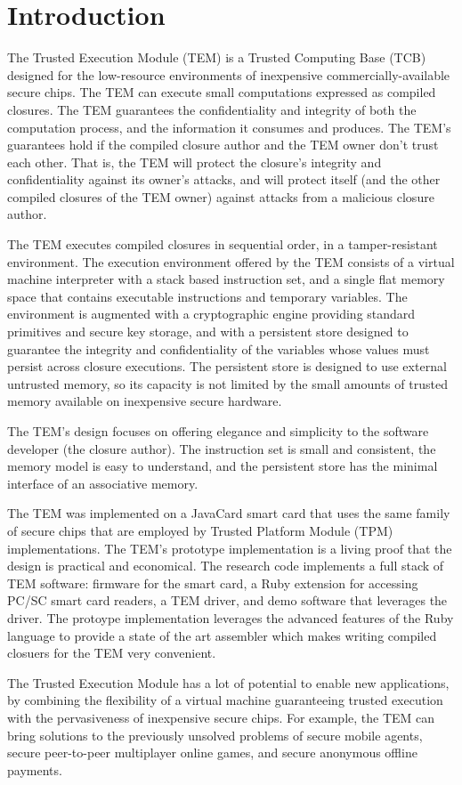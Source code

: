 \chapter{Introduction}\label{intro}

The Trusted Execution Module (TEM) is a Trusted Computing Base (TCB) designed
for the low-resource environments of inexpensive commercially-available secure
chips. The TEM can execute small computations expressed as compiled closures.
The TEM guarantees the confidentiality and integrity of both the computation
process, and the information it consumes and produces. The TEM's guarantees
hold if the compiled closure author and the TEM owner don't trust each other.
That is, the TEM will protect the closure's integrity and confidentiality
against its owner's attacks, and will protect itself (and the other
compiled closures of the TEM owner) against attacks from a malicious closure
author.

The TEM executes compiled closures in sequential order, in a tamper-resistant
environment. The execution environment offered by the TEM consists of a virtual
machine interpreter with a stack based instruction set, and a single flat
memory space that contains executable instructions and temporary variables. The
environment is augmented with a cryptographic engine providing standard
primitives and secure key storage, and with a persistent store designed to
guarantee the integrity and confidentiality of the variables whose values must
persist across closure executions. The persistent store is designed to use
external untrusted memory, so its capacity is not limited by the small amounts
of trusted memory available on inexpensive secure hardware.

The TEM's design focuses on offering elegance and simplicity to the software
developer (the closure author). The instruction set is small and consistent,
the memory model is easy to understand, and the persistent store has the minimal
interface of an associative memory. 

The TEM was implemented on a JavaCard smart card that uses the same family of
secure chips that are employed by Trusted Platform Module (TPM)
implementations. The TEM's prototype implementation is a living proof that the
design is practical and economical. The research code implements a full stack
of TEM software: firmware for the smart card, a Ruby extension for accessing
PC/SC smart card readers, a TEM driver, and demo software that leverages the
driver. The protoype implementation leverages the advanced features of the
Ruby language to provide a state of the art assembler which makes writing
compiled closuers for the TEM very convenient.

The Trusted Execution Module has a lot of potential to enable new applications,
by combining the flexibility of a virtual machine guaranteeing trusted
execution with the pervasiveness of inexpensive secure chips. For example, the
TEM can bring solutions to the previously unsolved problems of secure mobile
agents, secure peer-to-peer multiplayer online games, and secure anonymous
offline payments.
